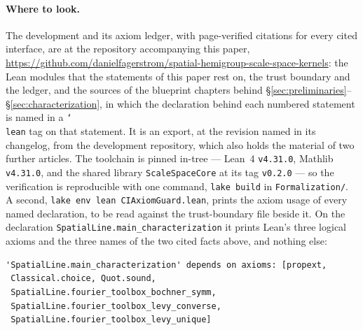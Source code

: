 \paragraph{Where to look.} The development and its axiom ledger, with page-verified
citations for every cited interface, are at the repository accompanying this paper,
\url{https://github.com/danielfagerstrom/spatial-hemigroup-scale-space-kernels}: the Lean
modules that the statements of this paper rest on, the trust boundary and the ledger, and
the sources of the blueprint chapters behind
\S\ref{sec:preliminaries}--\S\ref{sec:characterization}, in which the declaration behind
each numbered statement is named in a \texttt{\char`\\lean} tag on that statement. It is an
export, at the revision named in its changelog, from the development repository, which also
holds the material of two further articles. The toolchain is pinned in-tree --- Lean~4
\texttt{v4.31.0}, Mathlib \texttt{v4.31.0}, and the shared library \texttt{ScaleSpaceCore}
at its tag \texttt{v0.2.0} --- so the verification is reproducible with one command,
\texttt{lake build} in \texttt{Formalization/}. A second,
\texttt{lake env lean CIAxiomGuard.lean}, prints the axiom usage of every named declaration,
to be read against the trust-boundary file beside it. On the declaration
\texttt{SpatialLine.main\_characterization} it prints Lean's three logical axioms and the
three names of the two cited facts above, and nothing else:
\begin{verbatim}
'SpatialLine.main_characterization' depends on axioms: [propext,
 Classical.choice, Quot.sound,
 SpatialLine.fourier_toolbox_bochner_symm,
 SpatialLine.fourier_toolbox_levy_converse,
 SpatialLine.fourier_toolbox_levy_unique]
\end{verbatim}
